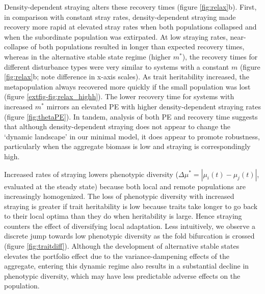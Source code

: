 \documentclass{revtex4}
\begin{document}
Density-dependent straying alters these recovery times (figure \ref{fig:relax}b). 
First, in comparison with constant stray rates, density-dependent straying made recovery more rapid at elevated stray rates when both populations collapsed and when the subordinate population was extirpated.
At low straying rates, near-collapse of both populations resulted in longer than expected recovery times, whereas in the alternative stable state regime (higher $m^*$), the recovery times for different disturbance types were very similar to systems with a constant $m$ (figure \ref{fig:relax}b; note difference in x-axis scales).
As trait heritability increased, the metapopulation always recovered more quickly if the small population was lost (figure \ref{extfig-fig:relax_highh}).
The lower recovery time for systems with increased $m^*$ mirrors an elevated PE with higher density-dependent straying rates (figure \ref{fig:thetaPE}).
In tandem, analysis of both PE and recovery time suggests that although density-dependent straying does not appear to change the `dynamic landscape' in our minimal model, it does appear to promote robustness, particularly when the aggregate biomass is low and straying is correspondingly high.





Increased rates of straying lowers phenotypic diversity ($\Delta \mu^* = |\mu_i(t)-\mu_j(t)|$, evaluated at the steady state) because both local and remote populations are increasingly homogenized.
The loss of phenotypic diversity with increased straying is greater if trait heritability is low because traits take longer to go back to their local optima than they do when heritability is large. 
Hence straying counters the effect of diversifying local adaptation. 
Less intuitively, we observe a discrete jump towards low phenotypic diversity as the fold bifurcation is crossed (figure \ref{fig:traitdiff}).
Although the development of alternative stable states elevates the portfolio effect due to the variance-dampening effects of the aggregate, entering this dynamic regime also results in a substantial decline in phenotypic diversity, which may have less predictable adverse effects on the population. 
\\
\end{document}
